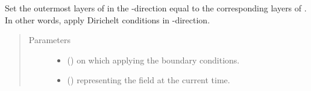 \documentclass[letterpaper,10pt,english]{sphinxmanual}
\begin{document}
\begin{fulllineitems}
\begin{fulllineitems}
\label{\detokenize{api:dycore.horizontal_boundary.Relaxed.set_outermost_layers_y}}
Set the outermost layers of  in the -direction equal to the corresponding
layers of . In other words, apply Dirichelt conditions in -direction.
\begin{quote}\begin{description}
\item[{Parameters}] \leavevmode\begin{itemize}
\item {} 
 () \textendash{}  on which applying the boundary conditions.

\item {} 
 () \textendash{}  representing the field at the current time.

\end{itemize}

\end{description}\end{quote}

\end{fulllineitems}


\end{fulllineitems}

\end{document}
